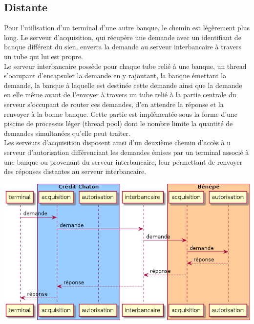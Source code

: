 \documentclass[french, a4paper, 12pt, titlepage]{article}
\begin{document}
\subsection{Distante}
Pour l'utilisation d'un terminal d'une autre banque, le chemin est légèrement plus long.
Le serveur d'acquisition, qui récupère une demande avec un identifiant de banque différent du sien, enverra la demande au serveur interbancaire à travers un tube qui lui est propre.\\
\noindent
Le serveur interbancaire possède pour chaque tube relié à une banque, un thread s'occupant d'encapsuler la demande en y rajoutant, la banque émettant la demande, la banque à laquelle est destinée cette demande ainsi que la demande en elle même avant de l'envoyer à travers un tube relié à la partie centrale du serveur s'occupant de router ces demandes, d'en attendre la réponse et la renvoyer à la bonne banque.
Cette partie est implémentée sous la forme d'une piscine de processus léger (thread pool) dont le nombre limite la quantité de demandes simultanées qu'elle peut traiter.\\
\noindent
Les serveurs d'acquisition disposent ainsi d'un deuxième chemin d'accès à u serveur d'autorisation différenciant les demandes émises par un terminal associé à une banque ou provenant du serveur interbancaire, leur permettant de renvoyer des réponses distantes au serveur interbancaire.
\medskip
\begin{center}
\includegraphics[scale=0.6]{transactionDistante}
\end{center}
\medskip
\end{document}
